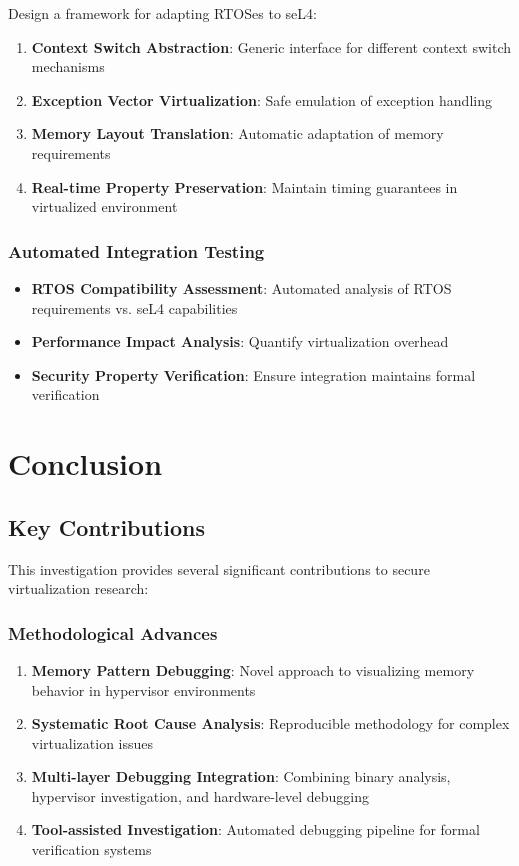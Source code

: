 \documentclass[11pt,a4paper]{article}
\begin{document}
Design a framework for adapting RTOSes to seL4:

\begin{enumerate}
    \item \textbf{Context Switch Abstraction}: Generic interface for different context switch mechanisms
    \item \textbf{Exception Vector Virtualization}: Safe emulation of exception handling
    \item \textbf{Memory Layout Translation}: Automatic adaptation of memory requirements
    \item \textbf{Real-time Property Preservation}: Maintain timing guarantees in virtualized environment
\end{enumerate}

\subsubsection{Automated Integration Testing}

\begin{itemize}
    \item \textbf{RTOS Compatibility Assessment}: Automated analysis of RTOS requirements vs. seL4 capabilities
    \item \textbf{Performance Impact Analysis}: Quantify virtualization overhead
    \item \textbf{Security Property Verification}: Ensure integration maintains formal verification
\end{itemize}

\section{Conclusion}

\subsection{Key Contributions}

This investigation provides several significant contributions to secure virtualization research:

\subsubsection{Methodological Advances}

\begin{enumerate}
    \item \textbf{Memory Pattern Debugging}: Novel approach to visualizing memory behavior in hypervisor environments
    \item \textbf{Systematic Root Cause Analysis}: Reproducible methodology for complex virtualization issues
    \item \textbf{Multi-layer Debugging Integration}: Combining binary analysis, hypervisor investigation, and hardware-level debugging
    \item \textbf{Tool-assisted Investigation}: Automated debugging pipeline for formal verification systems
\end{enumerate}
\end{document}
